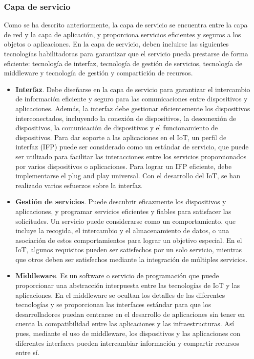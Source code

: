 {\subsubsection{Capa de servicio}

Como se ha descrito anteriormente, la capa de servicio se encuentra entre la capa de red y la capa de aplicación, y proporciona servicios eficientes y seguros a los objetos o aplicaciones. En la capa de servicio, deben incluirse las siguientes tecnologías habilitadoras para garantizar que el servicio pueda prestarse de forma eficiente: tecnología de interfaz, tecnología de gestión de servicios, tecnología de middleware y tecnología de gestión y compartición de recursos.

\begin{itemize}
    \item \textbf{Interfaz}. Debe diseñarse en la capa de servicio para garantizar el intercambio de información eficiente y seguro para las comunicaciones entre dispositivos y aplicaciones. Además, la interfaz debe gestionar eficientemente los dispositivos interconectados, incluyendo la conexión de dispositivos, la desconexión de dispositivos, la comunicación de dispositivos y el funcionamiento de dispositivos. Para dar soporte a las aplicaciones en el IoT, un perfil de interfaz (IFP) puede ser considerado como un estándar de servicio, que puede ser utilizado para facilitar las interacciones entre los servicios proporcionados por varios dispositivos o aplicaciones. Para lograr un IFP eficiente, debe implementarse el plug and play universal. Con el desarrollo del IoT, se han realizado varios esfuerzos sobre la interfaz.
    \item \textbf{Gestión de servicios}. Puede descubrir eficazmente los dispositivos y aplicaciones, y programar servicios eficientes y fiables para satisfacer las solicitudes. Un servicio puede considerarse como un comportamiento, que incluye la recogida, el intercambio y el almacenamiento de datos, o una asociación de estos comportamientos para lograr un objetivo especial. En el IoT, algunos requisitos pueden ser satisfechos por un solo servicio, mientras que otros deben ser satisfechos mediante la integración de múltiples servicios.
    \item \textbf{Middleware}. Es un software o servicio de programación que puede proporcionar una abstracción interpuesta entre las tecnologías de IoT y las aplicaciones. En el middleware se ocultan los detalles de las diferentes tecnologías y se proporcionan las interfaces estándar para que los desarrolladores puedan centrarse en el desarrollo de aplicaciones sin tener en cuenta la compatibilidad entre las aplicaciones y las infraestructuras. Así pues, mediante el uso de middleware, los dispositivos y las aplicaciones con diferentes interfaces pueden intercambiar información y compartir recursos entre sí. \cite{lin2017survey}
\end{itemize}


}

